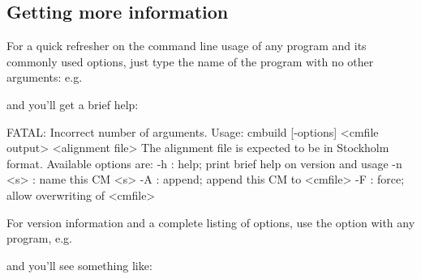 \subsection{Getting more information}

For a quick refresher on the command line usage of any program and its
commonly used options, just type the name of the program with no other
arguments: e.g.\


and you'll get a brief help:

\begin{sreoutput}
FATAL: Incorrect number of arguments.
Usage: cmbuild [-options] <cmfile output> <alignment file>
The alignment file is expected to be in Stockholm format.
  Available options are:
   -h     : help; print brief help on version and usage
   -n <s> : name this CM <s>
   -A     : append; append this CM to <cmfile>
   -F     : force; allow overwriting of <cmfile>
\end{sreoutput}

For version information and a complete listing of options, use the
 option with any program, e.g.\


and you'll see something like:

